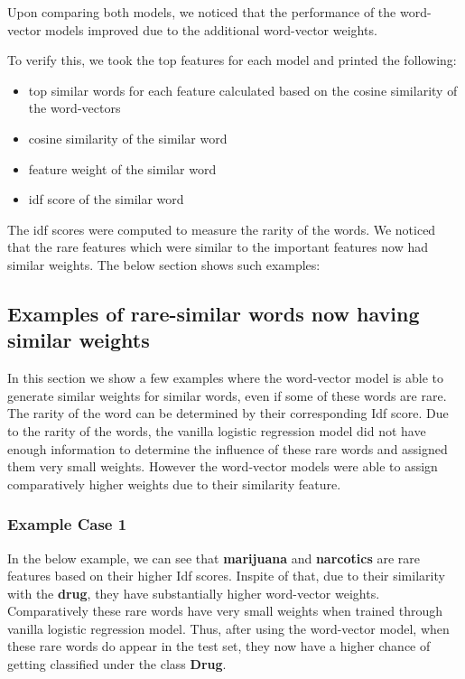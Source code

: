 Upon comparing both models, we noticed that the performance of the word-vector models improved due to the additional word-vector weights.

To verify this, we took the top features for each model and printed the following:

\begin{itemize}
\item top similar words for each feature calculated based on the cosine similarity of the word-vectors

\item cosine similarity of the similar word

\item feature weight of the similar word

\item idf score of the similar word
\end{itemize}

The idf scores were computed to measure the rarity of the words. We noticed that the rare features which were similar to the important features now had similar weights. The below section shows such examples:

\newpage
\subsection{Examples of rare-similar words now having similar weights}

In this section we show a few examples where the word-vector model is able to generate similar weights for similar words, even if some of these words are rare. The rarity of the word can be determined by their corresponding Idf score. Due to the rarity of the words, the vanilla logistic regression model did not have enough information to determine the influence of these rare words and assigned them very small weights. However the word-vector models were able to assign comparatively higher weights due to their similarity feature.

\subsubsection{Example Case 1}

In the below example, we can see that \textbf{marijuana} and \textbf{narcotics} are rare features based on their higher Idf scores. Inspite of that, due to their similarity with the \textbf{drug}, they have substantially higher word-vector weights. Comparatively these rare words have very small weights when trained through vanilla logistic regression model. Thus, after using the word-vector model, when these rare words do appear in the test set, they now have a higher chance of getting classified under the class \textbf{Drug}.

